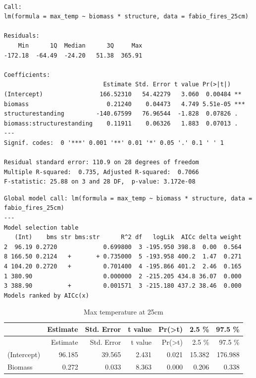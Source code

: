 \documentclass[11pt,a4paper]{article}
\begin{document}
\begin{verbatim}

Call:
lm(formula = max_temp ~ biomass * structure, data = fabio_fires_25cm)

Residuals:
    Min      1Q  Median      3Q     Max 
-172.18  -64.49  -24.20   51.38  365.91 

Coefficients:
                            Estimate Std. Error t value Pr(>|t|)    
(Intercept)                166.52310   54.42279   3.060  0.00484 ** 
biomass                      0.21240    0.04473   4.749 5.51e-05 ***
structurestanding         -140.67599   76.96544  -1.828  0.07826 .  
biomass:structurestanding    0.11911    0.06326   1.883  0.07013 .  
---
Signif. codes:  0 '***' 0.001 '**' 0.01 '*' 0.05 '.' 0.1 ' ' 1

Residual standard error: 110.9 on 28 degrees of freedom
Multiple R-squared:  0.735, Adjusted R-squared:  0.7066 
F-statistic: 25.88 on 3 and 28 DF,  p-value: 3.172e-08
\end{verbatim}

\begin{verbatim}
Global model call: lm(formula = max_temp ~ biomass * structure, data = fabio_fires_25cm)
---
Model selection table 
   (Int)    bms str bms:str      R^2 df   logLik  AICc delta weight
2  96.19 0.2720             0.699800  3 -195.950 398.8  0.00  0.564
8 166.50 0.2124   +       + 0.735000  5 -193.958 400.2  1.47  0.271
4 104.20 0.2720   +         0.701400  4 -195.866 401.2  2.46  0.165
1 380.90                    0.000000  2 -215.205 434.8 36.07  0.000
3 388.90          +         0.001571  3 -215.180 437.2 38.46  0.000
Models ranked by AICc(x) 
\end{verbatim}

\begin{longtable}[]{@{}lrrrrrr@{}}
\caption{Max temperature at 25cm}\tabularnewline
\toprule
& Estimate & Std. Error & t value &
Pr(\textgreater{}\textbar{}t\textbar{}) & 2.5 \% & 97.5
\%\tabularnewline
\midrule
\endfirsthead
\toprule
& Estimate & Std. Error & t value &
Pr(\textgreater{}\textbar{}t\textbar{}) & 2.5 \% & 97.5
\%\tabularnewline
\midrule
\endhead
(Intercept) & 96.185 & 39.565 & 2.431 & 0.021 & 15.382 &
176.988\tabularnewline
Biomass & 0.272 & 0.033 & 8.363 & 0.000 & 0.206 & 0.338\tabularnewline
\bottomrule
\end{longtable}
\end{document}
